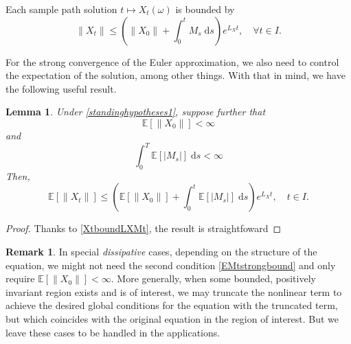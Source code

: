 \documentclass[reqno,12pt]{amsart}
\theoremstyle{plain} %
\newtheorem{lemma}{Lemma}[section]
\theoremstyle{definition} %
\newtheorem{remark}{Remark}[section]
\begin{document}
Each sample path solution $t \mapsto X_t(\omega)$ is bounded by
\begin{equation}
    \label{XtboundLXMt}
    \|X_t\| \leq \left(\|X_0\| + \int_0^t M_s\;\mathrm{d}s\right) e^{L_X t}, \quad \forall t\in I.
\end{equation}

For the strong convergence of the Euler approximation, we also need to control the expectation of the solution, among other things. With that in mind, we have the following useful result.
\begin{lemma}
    Under \cref{standinghypotheses1}, suppose further that
    \begin{equation}
        \label{EX0strongbound}
        \mathbb{E}[\|X_0\|] < \infty
    \end{equation}
    and
    \begin{equation}
        \label{EMtstrongbound}
        \int_0^T \mathbb{E}[|M_s|] \;\mathrm{d}s < \infty
    \end{equation}
    Then,
    \begin{equation}
        \label{EXtstrongbound}
        \mathbb{E}[\|X_t\|] \leq \left(\mathbb{E}[\|X_0\|] + \int_0^t \mathbb{E}[|M_s|]\;\mathrm{d}s\right) e^{L_X t}, \quad t\in I.
    \end{equation}
\end{lemma}

\begin{proof}
    Thanks to \eqref{XtboundLXMt}, the result is straightfoward
\end{proof}


\begin{remark}
    In special \emph{dissipative} cases, depending on the structure of the equation, we might not need the second condition \eqref{EMtstrongbound} and only require $\mathbb{E}[\|X_0\|] < \infty$. More generally, when some bounded, positively invariant region exists and is of interest, we may truncate the nonlinear term to achieve the desired global conditions for the equation with the truncated term, but which coincides with the original equation in the region of interest. But we leave these cases to be handled in the applications.
\end{remark}
\end{document}
